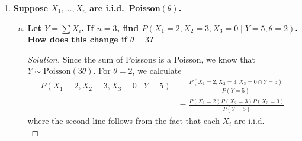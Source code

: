 \documentclass[11pt]{article}
\newenvironment{solution}
  {\renewcommand\qedsymbol{$\blacksquare$}\begin{proof}[Solution]}
  {\end{proof}}
\begin{document}
\begin{enumerate}
\begin{enumerate}[a)]
        \begin{solution}
        We know that $\frac{(n-1)s^2}{\sigma^2} \sim \chi_{n-1}^2$.  Suppose that $X \sim \chi_{n-1}^2$. Then
        \[
            \mathbb{E}\left[ \sqrt{\frac{(n-1)s^2}{\sigma^2}} \right] = \mathbb{E}\left[ \sqrt{x} \right].
        \]
        It follows from LOTUS and integral by recognition that
        \begin{align*}
            \mathbb{E}\left[ \sqrt{x} \right] &= \int_{0}^{\infty} \sqrt{x} f_X(x) \, dx \\
            &= \int_{0}^{\infty} \sqrt{x} \frac{x^{\frac{n-1}{2} - 1} e^{-\frac{x}{2}}}{2^{\frac{n-1}{2}} \Gamma\left( \frac{n - 1}{2} \right) } \, dx\\
            &= \frac{\sqrt{2}\Gamma\left( \frac{n}{2} \right)}{\Gamma \left( \frac{n-1}{2} \right) } \int_0^{\infty} \frac{x^{\frac{n}{2} - 1} e^{-\frac{x}{2}}}{2^{\frac{n}{2}} \Gamma\left( \frac{n}{2} \right) } \, dx \\
            &= \frac{\sqrt{2}\Gamma\left( \frac{n}{2} \right)}{\Gamma \left( \frac{n-1}{2} \right) }
        \end{align*}
        where the final step follows by recognizing the integrand as the pdf for a $\chi^2$ variable. It follows that
        \[
            \mathbb{E}\left[ \sqrt{\frac{(n-1)s^2}{\sigma^2}} \right] = \mathbb{E}\left[\frac{s}{\sigma} \sqrt{n-1} \right] = \frac{\sqrt{2}\Gamma\left( \frac{n}{2} \right)}{\Gamma \left( \frac{n-1}{2} \right) }.
        \]
        Using linearity of expectation, we find that 
        \[
          \mathbb{E}\left[s \right]  = \frac{\sigma}{\sqrt{n-1}} \frac{\sqrt{2}\Gamma\left( \frac{n}{2} \right)}{\Gamma \left( \frac{n-1}{2} \right) }. 
        \]
        Thus, an unbiased estimate for $\sigma$ is simply
        \[
            \boxed{\hat{\sigma} = \frac{\sqrt{n-1} }{\sigma \sqrt{2} } \frac{\Gamma\left( \frac{n-1}{2} \right) }{\Gamma \left( \frac{n}{2} \right) }}. \qedhere
        \]
        \end{solution}
    \end{enumerate}

    \item \textbf{Suppose $X_1, \dots, X_n$ are i.i.d.\ Poisson$(\theta)$.}
    
    \begin{enumerate}[a)]
        \item \textbf{Let $Y = \sum X_i$. If $n = 3$, find $P(X_1 = 2, X_2 = 3, X_3 = 0 \mid Y = 5, \theta = 2)$. How does this change if $\theta = 3$?}
        \begin{solution}
        Since the sum of Poissons is a Poisson, we know that $Y \sim \mathrm{Poisson}(3\theta)$. For $\theta = 2$, we calculate
        \begin{align*}
            P(X_1 = 2, X_2 = 3, X_3 = 0 \mid Y = 5) &= \frac{P(X_1 = 2, X_2 = 3, X_3 = 0 \cap Y=5)}{P(Y=5)} \\
            &= \frac{P(X_1 = 2)P(X_2 = 3)P(X_3 = 0)}{P(Y=5)}
        \end{align*}
        where the second line follows from the fact that each $X_i$ are i.i.d. \\


\end{solution}
\end{enumerate}
\end{enumerate}
\end{document}
